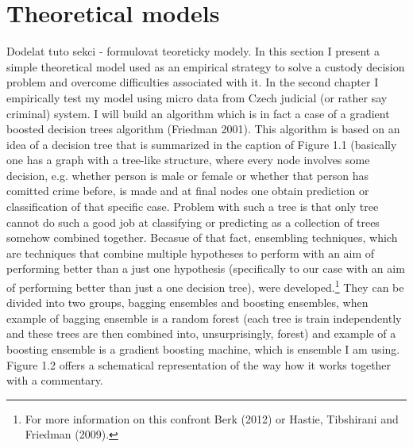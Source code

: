 \documentclass[12pt, twoside]{book} %
\begin{document}
\section{Theoretical models}    %
 \label{1.2}
Dodelat tuto sekci - formulovat teoreticky modely.
\medskip
\newline
In this section I present a simple theoretical model used as an empirical strategy to solve a custody decision problem and overcome difficulties associated with it. In the second chapter I empirically test my model using micro data from Czech judicial (or rather say criminal) system. I will build an algorithm which is in fact a case of a gradient boosted decision trees algorithm (Friedman 2001). This algorithm is based on an idea of a decision tree that is summarized in the caption of Figure 1.1 (basically one has a graph with a tree-like structure, where every node involves  some decision, e.g. whether person is male or female or whether that person has comitted crime before, is made and at final nodes one obtain prediction or classification of that specific case.\newline
Problem with such a tree is that only tree cannot do such a good job at classifying or predicting as a collection of trees somehow combined together. Becasue of that fact, ensembling techniques, which are techniques that combine multiple hypotheses to perform with an aim of performing better than a just one hypothesis (specifically to our case with an aim of performing better than just a one decision tree), were developed.\footnote{For more information on this confront Berk (2012) or Hastie, Tibshirani and Friedman (2009).} They can be divided into two groups, bagging ensembles and boosting ensembles, when example of bagging ensemble is a random forest (each tree is train independently and these trees are then combined into, unsurprisingly, forest) and example of a boosting ensemble is a gradient boosting machine, which is ensemble I am using. Figure 1.2 offers a schematical representation of the way how it works together with a commentary. 
\end{document}
